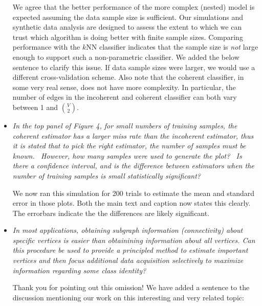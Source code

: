 \documentclass[11pt]{article}
\begin{document}
\begin{itemize}
	We agree that the better performance of the more complex (nested) model is expected assuming the data sample size is sufficient.  Our simulations and synthetic data analysis are designed to assess the extent to which we can trust which algorithm is doing better with finite sample sizes. Comparing performance with the $k$NN classifier indicates that the sample size is \emph{not} large enough to support such a non-parametric classifier.  We added the below sentence to clarify this issue.  If data sample sizes were larger, we would use a different cross-validation scheme. Also note that the coherent classifier, in some very real sense, does not have more complexity.  In particular, the number of edges in the incoherent and coherent classifier can both vary between 1 and $\binom{V}{2}$.
	

	\item \emph{In the top panel of Figure 4, for small numbers of training samples, the coherent estimator has a larger miss rate than the incoherent estimator, thus it is stated that to pick the right estimator, the number of samples must be known.  However, how many samples were used to generate the plot?  Is there a confidence interval, and is the difference between estimators when the number of training samples is small statistically significant?}
	
	We now ran this simulation for 200 trials to estimate the mean and standard error in those plots.  Both the main text and caption now states this clearly.  The errorbars indicate the the differences are likely significant.
	
	
	\item \emph{In most applications, obtaining subgraph information (connectivity) about specific vertices is easier than obtainining information about all vertices. Can this procedure be used to provide a principled method to estimate important vertices and then focus additional data acquisition selectively to maximize information regarding some class identity?}
	
	Thank you for pointing out this omission!  We have added a sentence to the discussion mentioning our work on this interesting and very related topic:
	

\end{itemize}
\end{document}
